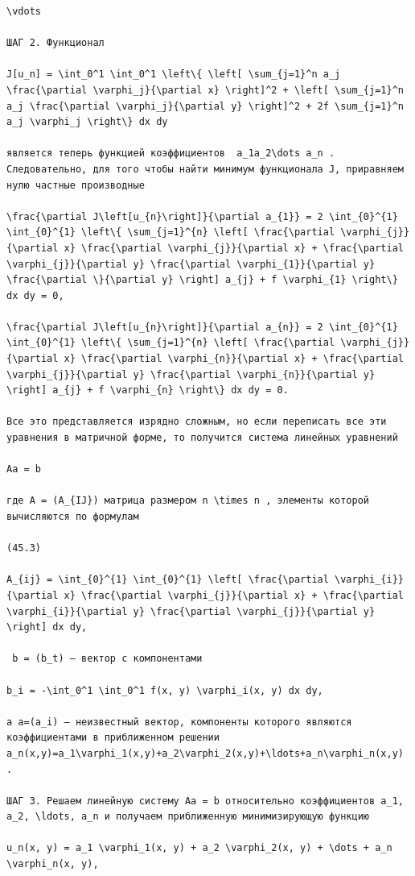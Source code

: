 \documentclass[
  ukrainian,
]{article}
\begin{document}
\begin{verbatim}
\vdots

ШАГ 2. Функционал

J[u_n] = \int_0^1 \int_0^1 \left\{ \left[ \sum_{j=1}^n a_j \frac{\partial \varphi_j}{\partial x} \right]^2 + \left[ \sum_{j=1}^n a_j \frac{\partial \varphi_j}{\partial y} \right]^2 + 2f \sum_{j=1}^n a_j \varphi_j \right\} dx dy

является теперь функцией коэффициентов  a_1a_2\dots a_n . Следовательно, для того чтобы найти минимум функционала J, приравняем нулю частные производные

\frac{\partial J\left[u_{n}\right]}{\partial a_{1}} = 2 \int_{0}^{1} \int_{0}^{1} \left\{ \sum_{j=1}^{n} \left[ \frac{\partial \varphi_{j}}{\partial x} \frac{\partial \varphi_{j}}{\partial x} + \frac{\partial \varphi_{j}}{\partial y} \frac{\partial \varphi_{1}}{\partial y} \frac{\partial \}{\partial y} \right] a_{j} + f \varphi_{1} \right\} dx dy = 0,

\frac{\partial J\left[u_{n}\right]}{\partial a_{n}} = 2 \int_{0}^{1} \int_{0}^{1} \left\{ \sum_{j=1}^{n} \left[ \frac{\partial \varphi_{j}}{\partial x} \frac{\partial \varphi_{n}}{\partial x} + \frac{\partial \varphi_{j}}{\partial y} \frac{\partial \varphi_{n}}{\partial y} \right] a_{j} + f \varphi_{n} \right\} dx dy = 0.

Все это представляется изрядно сложным, но если переписать все эти уравнения в матричной форме, то получится система линейных уравнений

Aa = b

где A = (A_{IJ}) матрица размером n \times n , элементы которой вычисляются по формулам

(45.3)

A_{ij} = \int_{0}^{1} \int_{0}^{1} \left[ \frac{\partial \varphi_{i}}{\partial x} \frac{\partial \varphi_{j}}{\partial x} + \frac{\partial \varphi_{i}}{\partial y} \frac{\partial \varphi_{j}}{\partial y} \right] dx dy,

 b = (b_t) — вектор с компонентами

b_i = -\int_0^1 \int_0^1 f(x, y) \varphi_i(x, y) dx dy,

а a=(a_i) — неизвестный вектор, компоненты которого являются коэффициентами в приближенном решении a_n(x,y)=a_1\varphi_1(x,y)+a_2\varphi_2(x,y)+\ldots+a_n\varphi_n(x,y) .

ШАГ 3. Решаем линейную систему Aa = b относительно коэффициентов a_1, a_2, \ldots, a_n и получаем приближенную минимизирующую функцию

u_n(x, y) = a_1 \varphi_1(x, y) + a_2 \varphi_2(x, y) + \dots + a_n \varphi_n(x, y),


\end{verbatim}
\end{document}
